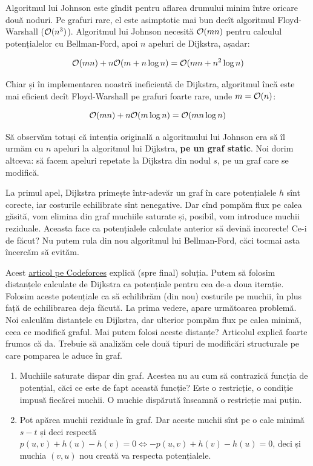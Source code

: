 \documentclass[../main.tex]{subfiles}
\begin{document}
Algoritmul lui Johnson este gîndit pentru aflarea drumului minim între oricare două noduri. Pe grafuri rare, el este asimptotic mai bun decît algoritmul Floyd-Warshall ($\mathcal{O}(n^3)$). Algoritmul lui Johnson necesită $\mathcal{O}(mn)$ pentru calculul potențialelor cu Bellman-Ford, apoi $n$ apeluri de Dijkstra, așadar:

$$\mathcal{O}(mn) + n \mathcal{O}(m + n \log n) = \mathcal{O}(mn + n^2 \log n)$$

Chiar și în implementarea noastră ineficientă de Dijkstra, algoritmul încă este mai eficient decît Floyd-Warshall pe grafuri foarte rare, unde $m = \mathcal{O}(n)$:

$$\mathcal{O}(mn) + n \mathcal{O}(m \log n) = \mathcal{O}(mn \log n)$$

Să observăm totuși că intenția originală a algoritmului lui Johnson era să îl urmăm cu $n$ apeluri la algoritmul lui Dijkstra, \textbf{pe un graf static}. Noi dorim altceva: să facem apeluri repetate la Dijkstra din nodul $s$, pe un graf care se modifică.

La primul apel, Dijkstra primește într-adevăr un graf în care potențialele $h$ sînt corecte, iar costurile echilibrate sînt nenegative. Dar cînd pompăm flux pe calea găsită, vom elimina din graf muchiile saturate și, posibil, vom introduce muchii reziduale. Aceasta face ca potențialele calculate anterior să devină incorecte! Ce-i de făcut? Nu putem rula din nou algoritmul lui Bellman-Ford, căci tocmai asta încercăm să evităm.

Acest \href{https://codeforces.com/blog/entry/95823}{articol pe Codeforces} explică (spre final) soluția. Putem să folosim distanțele calculate de Dijkstra ca potențiale pentru cea de-a doua iterație. Folosim aceste potențiale ca să echilibrăm (din nou) costurile pe muchii, în plus față de echilibrarea deja făcută. La prima vedere, apare următoarea problemă. Noi calculăm distanțele cu Dijkstra, dar ulterior pompăm flux pe calea minimă, ceea ce modifică graful. Mai putem folosi aceste distanțe? Articolul explică foarte frumos că da. Trebuie să analizăm cele două tipuri de modificări structurale pe care pomparea le aduce în graf.

\begin{enumerate}
  \item Muchiile saturate dispar din graf. Acestea nu au cum să contrazică funcția de potențial, căci ce este de fapt această funcție? Este o restricție, o condiție impusă fiecărei muchii. O muchie dispărută înseamnă o restricție mai puțin.
  \item Pot apărea muchii reziduale în graf. Dar aceste muchii sînt pe o cale minimă $s-t$ și deci respectă $p(u, v) + h(u) - h(v) = 0 \Leftrightarrow -p(u, v) + h(v) - h(u) = 0$, deci și muchia $(v, u)$ nou creată va respecta potențialele.
\end{enumerate}
\end{document}
